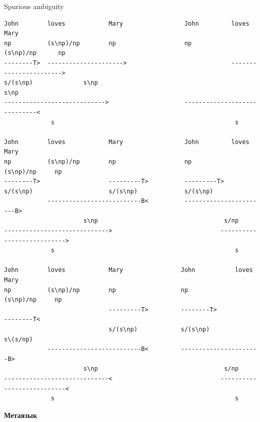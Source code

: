 \documentclass{beamer}
\begin{document}
\begin{frame}[fragile]{Spurious ambiguity}
\begin{tiny}
\begin{verbatim}
John        loves            Mary                 John         loves          Mary
np          (s\np)/np        np                   np           (s\np)/np      np
--------T>  --------------------->                             ----------------------->
s/(s\np)              s\np                                              s\np
---------------------------->                     -----------------------------<
             s                                                  s
 
John        loves            Mary                 John         loves          Mary 
np          (s\np)/np        np                   np           (s\np)/np     np
--------T>                   ---------T>          ---------T>
s/(s\np)                     s/(s\np)             s/(s\np)
            --------------------------B<          -----------------------B>
                      s\np                                   s/np
----------------------------->                              --------------------------->
             s                                                  s

John        loves            Mary                John           loves         Mary
np          (s\np)/np        np                  np             (s\np)/np     np
                             ---------T>         --------T>                   --------T<
                             s/(s\np)            s/(s\np)                     s\(s/np)
            --------------------------B<         ----------------------B>
                      s\np                                   s/np
-----------------------------<                              ---------------------------<
             s                                                  s
\end{verbatim}
\end{tiny}
\end{frame}




\iffalse

\begin{frame}{}
\begin{center}
	\textbf{Метаязык}
\end{center}
\end{frame}
\end{document}
